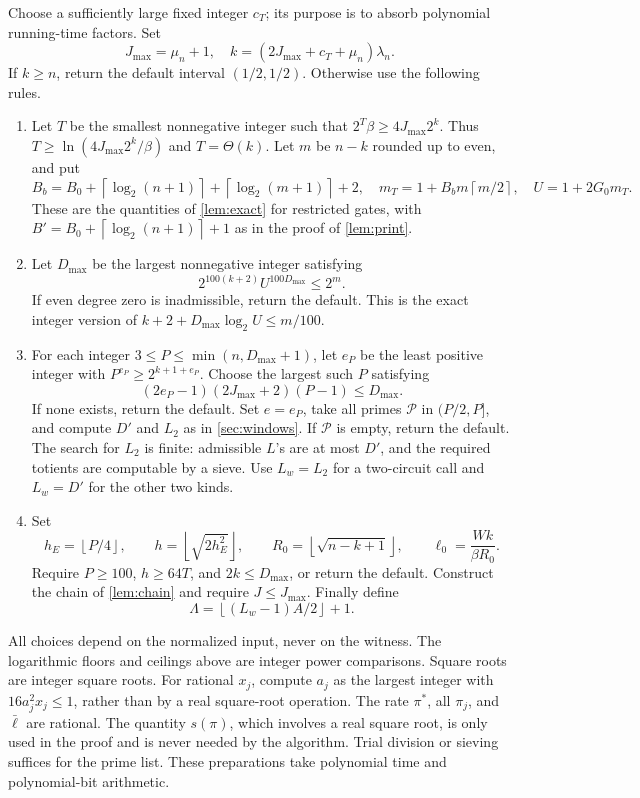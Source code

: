 \documentclass[11pt,letterpaper]{article}
\theoremstyle{definition}
\theoremstyle{remark}
\newcommand{\ceil}[1]{\left\lceil #1\right\rceil}
\newcommand{\floor}[1]{\left\lfloor #1\right\rfloor}
\newcommand{\cP}{\mathcal P}
\newcommand{\lgx}{\log_2}
\begin{document}
Choose a sufficiently large fixed integer \(c_T\); its purpose is to
absorb polynomial running-time factors. Set
\[
 J_{\max}=\mu_n+1,\quad
 k=(2J_{\max}+c_T+\mu_n)\lambda_n.
\]
If \(k\ge n\), return the default interval \((1/2,1/2)\).
Otherwise use the following rules.
\begin{enumerate}[label=\arabic*.]
\item Let \(T\) be the smallest nonnegative integer such that
\(2^T\beta\ge4J_{\max}2^k\). Thus
\(T\ge\ln(4J_{\max}2^k/\beta)\) and \(T=\Theta(k)\).
Let \(m\) be \(n-k\) rounded up to even, and put
\[
 B_b=B_0+\ceil{\lgx(n+1)}+\ceil{\lgx(m+1)}+2,
 \quad m_T=1+B_bm\ceil{m/2},\quad U=1+2G_0m_T.
\]
These are the quantities of \cref{lem:exact} for restricted gates,
with \(B'=B_0+\ceil{\lgx(n+1)}+1\) as in the proof of \cref{lem:print}.
\item Let \(D_{\max}\) be the largest nonnegative integer satisfying
\begin{equation}\label{eq:degree-budget}
 2^{100(k+2)}U^{100D_{\max}}\le2^m.
\end{equation}
If even degree zero is inadmissible, return the default.
This is the exact integer version of
\(k+2+D_{\max}\lgx U\le m/100\).
\item For each integer \(3\le P\le\min(n,D_{\max}+1)\), let \(e_P\)
be the least positive integer with
\(P^{e_P}\ge2^{k+1+e_P}\).
Choose the largest such \(P\) satisfying
\begin{equation}\label{eq:prime-budget}
 (2e_P-1)(2J_{\max}+2)(P-1)\le D_{\max}.
\end{equation}
If none exists, return the default. Set \(e=e_P\), take all primes
\(\cP\) in \((P/2,P]\), and compute \(D'\) and \(L_2\) as in
\cref{sec:windows}. If \(\cP\) is empty, return the default.
The search for \(L_2\) is finite: admissible \(L\)'s are at most
\(D'\), and the required totients are computable by a sieve.
Use \(L_w=L_2\) for a two-circuit call and \(L_w=D'\) for the other
two kinds.
\item Set
\[
 h_E=\floor{P/4},\qquad h=\floor{\sqrt{2h_E^2}},\qquad
 R_0=\floor{\sqrt{n-k+1}},\qquad \ell_0=\frac{Wk}{\beta R_0}.
\]
Require \(P\ge100\), \(h\ge64T\), and \(2k\le D_{\max}\), or
return the default. Construct the chain of \cref{lem:chain} and
require \(J\le J_{\max}\). Finally define
\[
 \Lambda=\floor{(L_w-1)A/2}+1.
\]
\end{enumerate}

All choices depend on the normalized input, never on the witness.
The logarithmic floors and ceilings above are integer power
comparisons. Square roots are integer square roots. For rational
\(x_j\), compute \(a_j\) as the largest integer with
\(16a_j^2x_j\le1\), rather than by a real square-root operation.
The rate \(\pi^*\), all \(\pi_j\), and \(\bar\ell\) are rational.
The quantity \(s(\pi)\), which involves a real square root, is only
used in the proof and is never needed by the algorithm.
Trial division or sieving suffices for the prime list. These
preparations take polynomial time and polynomial-bit arithmetic.
\end{document}
